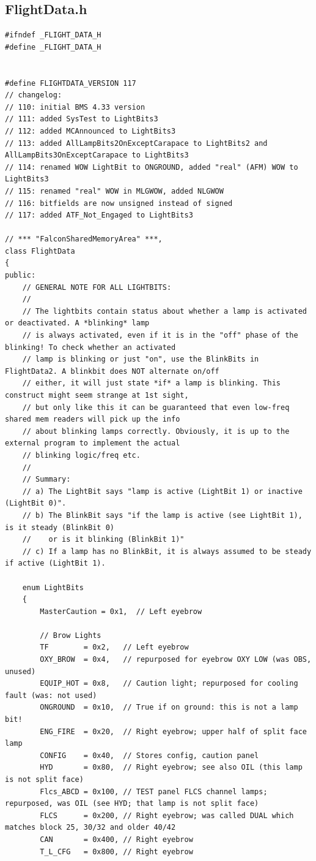 \documentclass[11pt,letterpaper,titlepage]{article}
\begin{document}
\newpage
{}
\appendix
\begin{landscape}
\section{FlightData.h}

\appendix
\begin{lstlisting}
#ifndef _FLIGHT_DATA_H
#define _FLIGHT_DATA_H


#define FLIGHTDATA_VERSION 117
// changelog:
// 110: initial BMS 4.33 version
// 111: added SysTest to LightBits3
// 112: added MCAnnounced to LightBits3
// 113: added AllLampBits2OnExceptCarapace to LightBits2 and AllLampBits3OnExceptCarapace to LightBits3
// 114: renamed WOW LightBit to ONGROUND, added "real" (AFM) WOW to LightBits3
// 115: renamed "real" WOW in MLGWOW, added NLGWOW
// 116: bitfields are now unsigned instead of signed
// 117: added ATF_Not_Engaged to LightBits3

// *** "FalconSharedMemoryArea" ***,
class FlightData 
{
public:
	// GENERAL NOTE FOR ALL LIGHTBITS:
	//
	// The lightbits contain status about whether a lamp is activated or deactivated. A *blinking* lamp
	// is always activated, even if it is in the "off" phase of the blinking! To check whether an activated
	// lamp is blinking or just "on", use the BlinkBits in FlightData2. A blinkbit does NOT alternate on/off
	// either, it will just state *if* a lamp is blinking. This construct might seem strange at 1st sight,
	// but only like this it can be guaranteed that even low-freq shared mem readers will pick up the info
	// about blinking lamps correctly. Obviously, it is up to the external program to implement the actual
	// blinking logic/freq etc.
	//
	// Summary:
	// a) The LightBit says "lamp is active (LightBit 1) or inactive (LightBit 0)".
	// b) The BlinkBit says "if the lamp is active (see LightBit 1), is it steady (BlinkBit 0)
	//    or is it blinking (BlinkBit 1)"
	// c) If a lamp has no BlinkBit, it is always assumed to be steady if active (LightBit 1).
	
	enum LightBits
    {
        MasterCaution = 0x1,  // Left eyebrow

        // Brow Lights
        TF        = 0x2,   // Left eyebrow
        OXY_BROW  = 0x4,   // repurposed for eyebrow OXY LOW (was OBS, unused)
        EQUIP_HOT = 0x8,   // Caution light; repurposed for cooling fault (was: not used)
        ONGROUND  = 0x10,  // True if on ground: this is not a lamp bit!
        ENG_FIRE  = 0x20,  // Right eyebrow; upper half of split face lamp
        CONFIG    = 0x40,  // Stores config, caution panel
        HYD       = 0x80,  // Right eyebrow; see also OIL (this lamp is not split face)
        Flcs_ABCD = 0x100, // TEST panel FLCS channel lamps; repurposed, was OIL (see HYD; that lamp is not split face)
        FLCS      = 0x200, // Right eyebrow; was called DUAL which matches block 25, 30/32 and older 40/42
        CAN       = 0x400, // Right eyebrow
        T_L_CFG   = 0x800, // Right eyebrow


\end{lstlisting}
\end{landscape}
\end{document}

